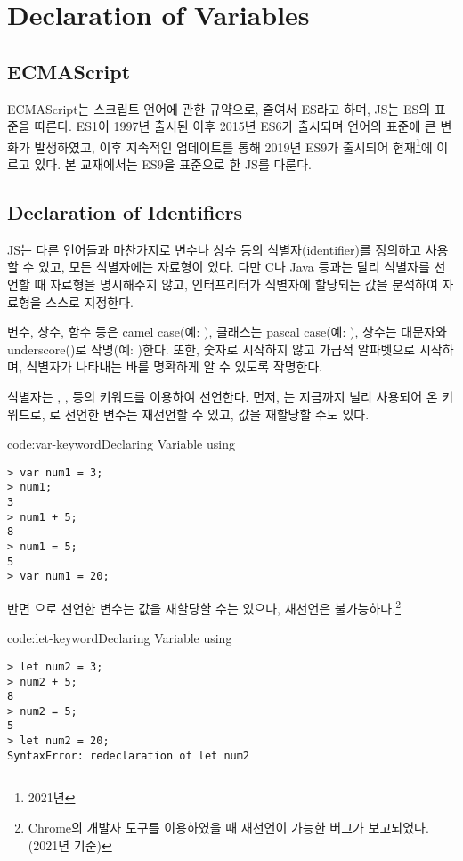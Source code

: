 \section{Declaration of Variables} \label{sect:declaration-of-variables}

\subsection*{ECMAScript}

ECMAScript는 스크립트 언어에 관한 규약으로, 줄여서 ES라고 하며, JS는 ES의 표준을 따른다. ES1이 1997년 출시된 이후 2015년 ES6가 출시되며 언어의 표준에 큰 변화가 발생하였고, 이후 지속적인 업데이트를 통해 2019년 ES9가 출시되어 현재\footnote{2021년}에 이르고 있다. 본 교재에서는 ES9을 표준으로 한 JS를 다룬다.

\subsection*{Declaration of Identifiers}

JS는 다른 언어들과 마찬가지로 변수나 상수 등의 식별자(identifier)를 정의하고 사용할 수 있고, 모든 식별자에는 자료형이 있다. 다만 C나 Java 등과는 달리 식별자를 선언할 때 자료형을 명시해주지 않고, 인터프리터가 식별자에 할당되는 값을 분석하여 자료형을 스스로 지정한다.

변수, 상수, 함수 등은 camel case(예: ), 클래스는 pascal case(예: ), 상수는 대문자와 underscore(\cd{\_})로 작명(예: )한다. 또한, 숫자로 시작하지 않고 가급적 알파벳으로 시작하며, 식별자가 나타내는 바를 명확하게 알 수 있도록 작명한다.

식별자는 , ,  등의 키워드를 이용하여 선언한다. 먼저, 는 지금까지 널리 사용되어 온 키워드로, 로 선언한 변수는 재선언할 수 있고, 값을 재할당할 수도 있다.

\begin{codeenv}{code:var-keyword}{Declaring Variable using }\begin{verbatim}
> var num1 = 3;
> num1;
3
> num1 + 5;
8
> num1 = 5;
5
> var num1 = 20;
\end{verbatim}
\end{codeenv}

반면 으로 선언한 변수는 값을 재할당할 수는 있으나, 재선언은 불가능하다.\footnote{Chrome의 개발자 도구를 이용하였을 때 재선언이 가능한 버그가 보고되었다. (2021년 기준)}

\begin{codeenv}{code:let-keyword}{Declaring Variable using }\begin{verbatim}
> let num2 = 3;
> num2 + 5;
8
> num2 = 5;
5
> let num2 = 20;
SyntaxError: redeclaration of let num2
\end{verbatim}
\end{codeenv}


